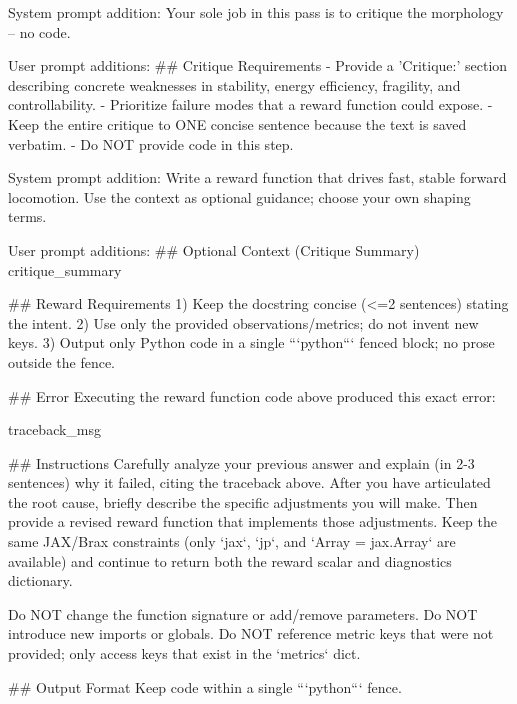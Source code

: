 \begin{promptbox}
System prompt addition:
Your sole job in this pass is to critique the morphology -- no code.

User prompt additions:
## Critique Requirements
- Provide a 'Critique:' section describing concrete weaknesses in stability, energy efficiency, fragility, and controllability.
- Prioritize failure modes that a reward function could expose.
- Keep the entire critique to ONE concise sentence because the text is saved verbatim.
- Do NOT provide code in this step.
\end{promptbox}

\begin{promptbox}
System prompt addition:
Write a reward function that drives fast, stable forward locomotion. Use the context as optional guidance; choose your own shaping terms.

User prompt additions:
## Optional Context (Critique Summary)
{critique_summary}

## Reward Requirements
1) Keep the docstring concise (<=2 sentences) stating the intent.
2) Use only the provided observations/metrics; do not invent new keys.
3) Output only Python code in a single ```python``` fenced block; no prose outside the fence.
\end{promptbox}

\begin{promptbox}
## Error
Executing the reward function code above produced this exact error:

{traceback_msg}

## Instructions
Carefully analyze your previous answer and explain (in 2-3 sentences) why it failed, citing the traceback above. After you have articulated the root cause, briefly describe the specific adjustments you will make. Then provide a revised reward function that implements those adjustments. Keep the same JAX/Brax constraints (only `jax`, `jp`, and `Array = jax.Array` are available) and continue to return both the reward scalar and diagnostics dictionary.

Do NOT change the function signature or add/remove parameters. Do NOT introduce new imports or globals. Do NOT reference metric keys that were not provided; only access keys that exist in the `metrics` dict.

## Output Format
Keep code within a single ```python``` fence.
\end{promptbox}


